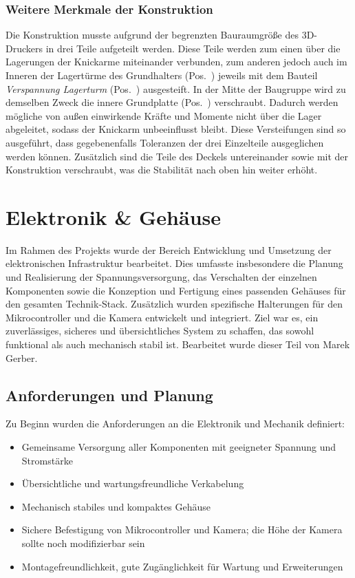 \documentclass[11pt, a4paper]{scrreprt}
\newcommand{\posnr}[1]{(Pos.~\tikz[baseline=(c.base)]{
    \node[draw,circle,inner sep=0pt,minimum size=2ex] (c)
    {\scriptsize #1};})}
\begin{document}
\subsection{Weitere Merkmale der Konstruktion}
Die Konstruktion musste aufgrund der begrenzten Bauraumgröße des 3D-Druckers in drei Teile aufgeteilt werden. Diese Teile werden zum einen über die Lagerungen der Knickarme miteinander verbunden, zum anderen jedoch auch im Inneren der Lagertürme des Grundhalters \posnr{1} jeweils mit dem Bauteil \textit{Verspannung Lagerturm} \posnr{6} ausgesteift. In der Mitte der Baugruppe wird zu demselben Zweck die innere Grundplatte \posnr{3} verschraubt. Dadurch werden mögliche von außen einwirkende Kräfte und Momente nicht über die Lager abgeleitet, sodass der Knickarm unbeeinflusst bleibt. Diese Versteifungen sind so ausgeführt, dass gegebenenfalls Toleranzen der drei Einzelteile ausgeglichen werden können. Zusätzlich sind die Teile des Deckels untereinander sowie mit der Konstruktion verschraubt, was die Stabilität nach oben hin weiter erhöht.

\chapter{Elektronik \& Gehäuse}

Im Rahmen des Projekts wurde der Bereich Entwicklung und Umsetzung der elektronischen
Infrastruktur bearbeitet. Dies umfasste insbesondere die Planung und Realisierung der
Spannungsversorgung, das Verschalten der einzelnen Komponenten sowie die Konzeption und
Fertigung eines passenden Gehäuses für den gesamten Technik-Stack. Zusätzlich wurden
spezifische Halterungen für den Mikrocontroller und die Kamera entwickelt und integriert.
Ziel war es, ein zuverlässiges, sicheres und übersichtliches System zu schaffen, das sowohl
funktional als auch mechanisch stabil ist. Bearbeitet wurde dieser Teil von Marek Gerber.

\section{Anforderungen und Planung}

Zu Beginn wurden die Anforderungen an die Elektronik und Mechanik definiert:

\begin{itemize}
  \item Gemeinsame Versorgung aller Komponenten mit geeigneter Spannung und Stromstärke
  \item Übersichtliche und wartungsfreundliche Verkabelung
  \item Mechanisch stabiles und kompaktes Gehäuse
  \item Sichere Befestigung von Mikrocontroller und Kamera; die Höhe der Kamera sollte noch modifizierbar sein
  \item Montagefreundlichkeit, gute Zugänglichkeit für Wartung und Erweiterungen
\end{itemize}
\end{document}
